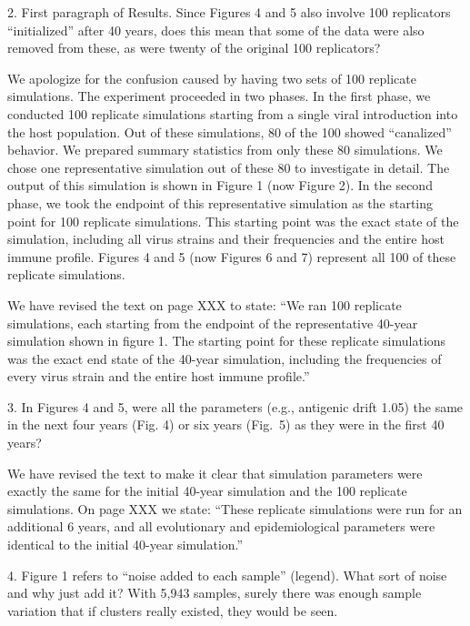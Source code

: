 \documentclass[11pt,oneside,letterpaper]{article}
\def\comment#1{
#1
}
\def\response#1{
\begin{bf}
#1
\end{bf}
}
\def\break{\vspace{0.2cm}}
\begin{document}
\break

\comment{2. First paragraph of Results. Since Figures 4 and 5 also involve 100 replicators ``initialized'' after 40 years, does this mean that some of the data were also removed from these, as were twenty of the original 100 replicators?}

\response{We apologize for the confusion caused by having two sets of 100 replicate simulations.  The experiment proceeded in two phases.  In the first phase, we conducted 100 replicate simulations starting from a single viral introduction into the host population.  Out of these simulations, 80 of the 100 showed ``canalized'' behavior.  We prepared summary statistics from only these 80 simulations.  We chose one representative simulation out of these 80 to investigate in detail.  The output of this simulation is shown in Figure 1 (now Figure 2).  In the second phase, we took the endpoint of this representative simulation as the starting point for 100 replicate simulations.  This starting point was the exact state of the simulation, including all virus strains and their frequencies and the entire host immune profile.  Figures 4 and 5 (now Figures 6 and 7) represent all 100 of these replicate simulations.}

\response{We have revised the text on page XXX to state: ``We ran 100 replicate simulations, each starting from the endpoint of the representative 40-year simulation shown in figure 1.  The starting point for these replicate simulations was the exact end state of the 40-year simulation, including the frequencies of every virus strain and the entire host immune profile.''}

\break

\comment{3. In Figures 4 and 5, were all the parameters (e.g., antigenic drift 1.05) the same in the next four years (Fig. 4) or six years (Fig.\ 5) as they were in the first 40 years?}

\response{We have revised the text to make it clear that simulation parameters were exactly the same for the initial 40-year simulation and the 100 replicate simulations.  On page XXX we state: ``These replicate simulations were run for an additional 6 years, and all evolutionary and epidemiological parameters were identical to the initial 40-year simulation.''}

\comment{4. Figure 1 refers to ``noise added to each sample'' (legend). What sort of noise and why just add it? With 5,943 samples, surely there was enough sample variation that if clusters really existed, they would be seen.}
\end{document}
